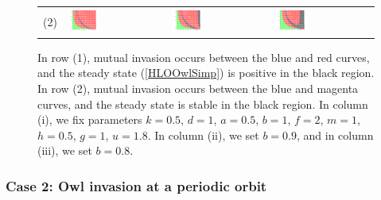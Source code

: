 \documentclass[12pt]{UOthesis}
\theoremstyle{remarkstyle}
\begin{document}
\begin{figure}[h!]
\begin{tabular}{m{0.07cm} m{4.5cm}  m{4.5cm}  m{4.5cm}}
		(2) & \includegraphics[width=0.33\textwidth]{HLOOwlSimpSSMutualInvasionOnEigenvalues1.png} & \includegraphics[width=0.33\textwidth]{HLOOwlSimpSSMutualInvasionOnEigenvalues2.png} & \includegraphics[width=0.33\textwidth]{HLOOwlSimpSSMutualInvasionOnEigenvalues3.png}\\
	\end{tabular}
	\caption[Mutual invasion and coexistence in the simplified owl model (steady state)]{In row (1), mutual invasion occurs between the blue and red curves, and the steady state (\ref{HLOOwlSimp}) is positive in the black region. In row (2), mutual invasion occurs between the blue and magenta curves, and the steady state is stable in the black region. In column (i), we fix parameters $k=0.5$, $d=1$, $a=0.5$, $b=1$, $f=2$, $m=1$, $h=0.5$, $g=1$, $u=1.8$. In column (ii), we set $b=0.9$, and in column (iii), we set $b=0.8$.\label{HLOOwlSimpSSMutualInvasionOnSteadyStatesAndEigenvalues}}%
\end{figure}

\subsubsection*{Case 2: Owl invasion at a periodic orbit}
\end{document}
